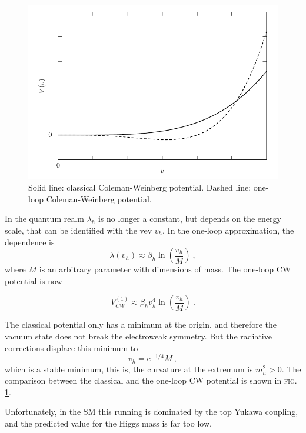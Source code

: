 \documentclass[aps,prd,preprintnumbers,nofootinbibn,twocolumn]{revtex4}
\begin{document}
\begin{figure}[t]
\centering
\includegraphics[width=\columnwidth]{potential}
\caption{Solid line: classical Coleman-Weinberg potential. Dashed line: one-loop Coleman-Weinberg potential.}\label{fig:CWpotential}
\end{figure} 

In the quantum realm $\lambda_h$ is no longer a constant, but depends on the energy scale, that can be identified with the vev $v_h$. In the one-loop approximation, the dependence is 
\begin{equation}
\lambda(v_h) \approx \beta_h \ln\left(\frac{v_h}{M}\right)\ , 
\end{equation}
where $M$ is an arbitrary parameter with dimensions of mass. The one-loop CW potential is now

\begin{equation}
V_{CW}^{(1)} \approx \beta_h v_h^4 \ln \left(\frac{v_h}{M}\right)\ .
\end{equation}

The classical potential only has a minimum at the origin, and therefore the vacuum state does not break the electroweak symmetry. But the radiative corrections displace this minimum to 
\begin{equation}
v_h = \mathrm{e}^{-1/4} M\ ,
\end{equation}
which is a stable minimum, this is, the curvature at the extremum is $m_h^2 > 0$. The comparison between the classical and the one-loop CW potential is shown in \textsc{fig.} \ref{fig:CWpotential}.

Unfortunately, in the SM this running is dominated by the top Yukawa coupling, and the predicted value for the Higgs mass is far too low.  
\end{document}

